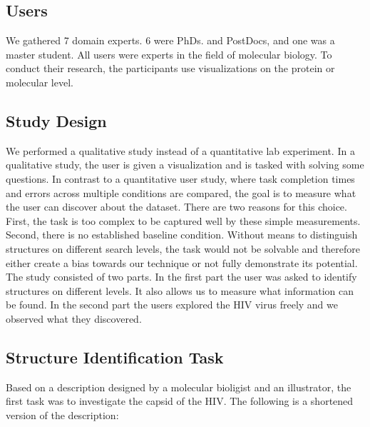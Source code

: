 \documentclass[review,journal]{vgtc}         %
\begin{document}
	
	\subsection{Users}
	We gathered 7 domain experts. 6 were PhDs. and PostDocs, and one was a master student. All users were experts in the field of molecular biology. 
	To conduct their research, the participants use visualizations on the protein or molecular level.
	
	
	\subsection{Study Design}
	We performed a qualitative study instead of a quantitative lab experiment.
	In a qualitative study, the user is given a visualization and is tasked with solving some questions. 
	In contrast to a quantitative user study, where task completion times and errors across multiple conditions are compared, the goal is to measure what the user can discover about the dataset.
	There are two reasons for this choice.
	First, the task is too complex to be captured well by these simple measurements. 
	Second, there is no established baseline condition.
	Without means to distinguish structures on different search levels, the task would not be solvable and therefore either create a bias towards our technique or not fully demonstrate its potential.
	The study consisted of two parts. In the first part the user was asked to identify structures on different levels. 
	It also allows us to measure what information can be found.  
	In the second part the users explored the HIV virus freely and we observed what they discovered.
	
	\subsection{Structure Identification Task}
	Based on a description designed by a molecular bioligist and an illustrator, the first task was to investigate the capsid of the HIV. 
	The following is a shortened version of the description: \\
	
\end{document}
